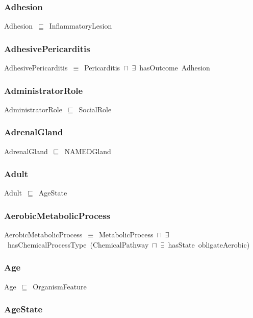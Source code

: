 \documentclass{article}
\begin{document}
\subsubsection*{Adhesion}

Adhesion~\ensuremath{\sqsubseteq}~InflammatoryLesion~

\subsubsection*{AdhesivePericarditis}

AdhesivePericarditis~\ensuremath{\equiv}~Pericarditis~\ensuremath{\sqcap}~\ensuremath{\exists}~hasOutcome~Adhesion

\subsubsection*{AdministratorRole}

AdministratorRole~\ensuremath{\sqsubseteq}~SocialRole~

\subsubsection*{AdrenalGland}

AdrenalGland~\ensuremath{\sqsubseteq}~NAMEDGland~

\subsubsection*{Adult}

Adult~\ensuremath{\sqsubseteq}~AgeState~

\subsubsection*{AerobicMetabolicProcess}

AerobicMetabolicProcess~\ensuremath{\equiv}~MetabolicProcess~\ensuremath{\sqcap}~\ensuremath{\exists}~hasChemicalProcessType~(ChemicalPathway~\ensuremath{\sqcap}~\ensuremath{\exists}~hasState~obligateAerobic)

\subsubsection*{Age}

Age~\ensuremath{\sqsubseteq}~OrganismFeature~

\subsubsection*{AgeState}
\end{document}
